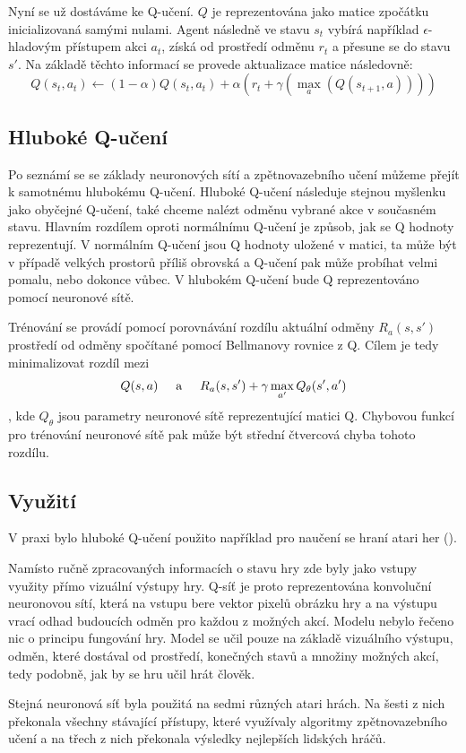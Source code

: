 Nyní se už dostáváme ke Q-učení. $Q$ je reprezentována jako matice zpočátku inicializovaná samými nulami. Agent následně ve stavu $s_t$ vybírá například $\epsilon$-hladovým přístupem akci $a_t$, získá od prostředí odměnu $r_t$ a přesune se do stavu $s'$.
Na základě těchto informací se provede aktualizace matice následovně:
\newline
\[Q(s_t,a_t) \leftarrow (1-\alpha)Q(s_t,a_t) + \alpha(r_t + \gamma(\max_a(Q(s_{t+1},a))))\]




\subsection{Hluboké Q-učení}
Po seznámí se se základy neuronových sítí a zpětnovazebního učení můžeme přejít k samotnému hlubokému Q-učení.
Hluboké Q-učení následuje stejnou myšlenku jako obyčejné Q-učení, také chceme nalézt odměnu vybrané akce v současném stavu.
Hlavním rozdílem oproti normálnímu Q-učení je způsob, jak se Q hodnoty reprezentují. V normálním Q-učení jsou Q hodnoty uložené v matici, ta může být v případě velkých prostorů příliš obrovská a Q-učení pak může probíhat velmi pomalu, nebo dokonce vůbec.
V hlubokém Q-učení bude Q reprezentováno pomocí neuronové sítě.

Trénování se provádí pomocí porovnávání rozdílu aktuální odměny $R_a(s,s')$ prostředí od odměny spočítané pomocí Bellmanovy rovnice z Q.
Cílem je tedy minimalizovat rozdíl mezi \[Q(s,a) \hspace{5mm}\text{a}\hspace{5mm}  R_a(s,s') + \gamma\max_{a'}Q_{\theta}(s',a')\], kde $Q_{\theta}$ jsou parametry neuronové sítě reprezentující matici Q.
Chybovou funkcí pro trénování neuronové sítě pak může být střední čtvercová chyba tohoto rozdílu.



\subsection{Využití}
V praxi bylo hluboké Q-učení použito například pro naučení se hraní atari her (\cite{atari}). 


Namísto ručně zpracovaných informacích o stavu hry zde byly jako vstupy využity přímo vizuální výstupy hry.
Q-síť je proto reprezentována konvoluční neuronovou sítí, která na vstupu bere vektor pixelů obrázku hry a na výstupu vrací odhad budoucích odměn pro každou z možných akcí.
Modelu nebylo řečeno nic o principu fungování hry. Model se učil pouze na základě vizuálního výstupu, odměn, které dostával od prostředí, konečných stavů a množiny možných akcí, tedy podobně, jak by se hru učil hrát člověk.

Stejná neuronová síť byla použitá na sedmi různých atari hrách. Na šesti z nich překonala všechny stávající přístupy, které využívaly algoritmy zpětnovazebního učení a na třech z nich překonala výsledky nejlepších lidských hráčů.


